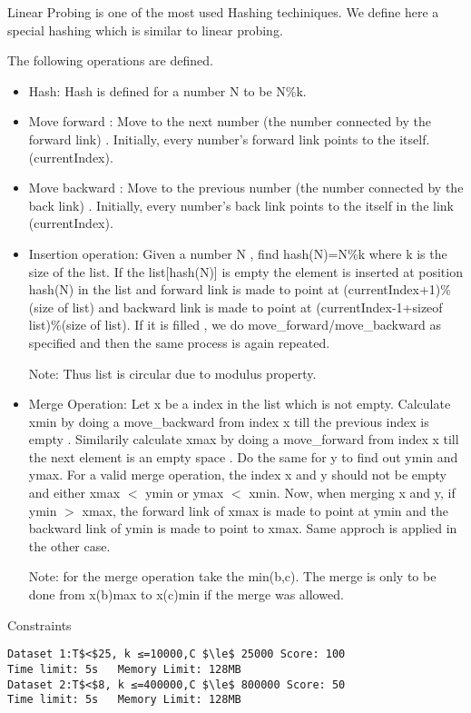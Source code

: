 Linear Probing is one of the most used Hashing techiniques. We define here a special hashing which is similar to linear probing.  

   The following operations are defined.  
\begin{itemize}
	\item     Hash: Hash is defined for a number N to be N\%k.   
	\item     Move forward : Move to the next number (the number connected by the forward link) . Initially, every number's forward link points to the itself. (currentIndex).   
	\item     Move backward : Move to the previous number (the number connected by the back link) . Initially, every number's back link points to the itself in the link (currentIndex).   
	\item     Insertion operation: Given a number N , find hash(N)=N\%k where k is the size of the list. If the list[hash(N)] is empty the element is inserted at position hash(N) in the list and forward link is made to point at (currentIndex+1)\%(size of list) and backward link is made to point at (currentIndex-1+sizeof list)\%(size of list). If it is filled , we do move\_forward/move\_backward as specified and then the same process is again repeated.   

    Note: Thus list is circular due to modulus property.   
	\item     Merge Operation: Let x be a index in the list which is not empty. Calculate xmin by doing a move\_backward from index x till the previous index is empty . Similarily calculate xmax by doing a move\_forward from index x till the next element is an empty space . Do the same for y to find out ymin and ymax. For a valid merge operation, the index x and y should not be empty and either xmax $<$ ymin or ymax $<$ xmin. Now, when merging x and y, if ymin $>$ xmax, the forward link of xmax is made to point at ymin and the backward link of ymin is made to point to xmax. Same approch is applied in the other case.   

    Note: for the merge operation take the min(b,c). The merge is only to be done from x(b)max to x(c)min if the merge was allowed.   
\end{itemize}
   Constraints  
\begin{verbatim}
Dataset 1:T$<$25, k ≤=10000,C $\le$ 25000 Score: 100
Time limit: 5s   Memory Limit: 128MB
Dataset 2:T$<$8, k ≤=400000,C $\le$ 800000 Score: 50
Time limit: 5s   Memory Limit: 128MB 
\end{verbatim}